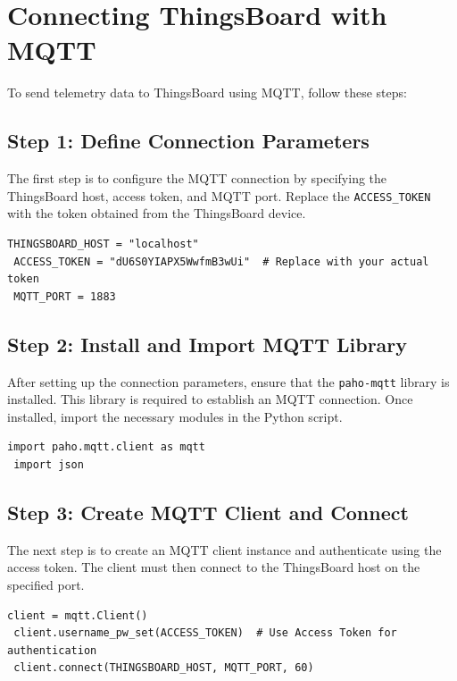 \documentclass[a4paper,12pt]{report}
\begin{document}
 
 \section{Connecting ThingsBoard with MQTT}
 
 To send telemetry data to ThingsBoard using MQTT, follow these steps:
 
 \subsection{Step 1: Define Connection Parameters}
 The first step is to configure the MQTT connection by specifying the ThingsBoard host, access token, and MQTT port. Replace the \texttt{ACCESS\_TOKEN} with the token obtained from the ThingsBoard device.
 
 \begin{lstlisting}[caption={Connection Parameters as Environment Variables}]
 THINGSBOARD_HOST = "localhost"
 ACCESS_TOKEN = "dU6S0YIAPX5WwfmB3wUi"  # Replace with your actual token
 MQTT_PORT = 1883
 \end{lstlisting}
 
 \subsection{Step 2: Install and Import MQTT Library}
 After setting up the connection parameters, ensure that the \texttt{paho-mqtt} library is installed. This library is required to establish an MQTT connection. Once installed, import the necessary modules in the Python script.
 
 \begin{lstlisting}[caption={Importing MQTT using Python}]
 import paho.mqtt.client as mqtt
 import json
 \end{lstlisting}
 
 \subsection{Step 3: Create MQTT Client and Connect}
 The next step is to create an MQTT client instance and authenticate using the access token. The client must then connect to the ThingsBoard host on the specified port.
 
 \begin{lstlisting}[caption={Connecting MQTT to ThingsBoard using Device Token}]
 client = mqtt.Client()
 client.username_pw_set(ACCESS_TOKEN)  # Use Access Token for authentication
 client.connect(THINGSBOARD_HOST, MQTT_PORT, 60)
 \end{lstlisting}
 
\end{document}
